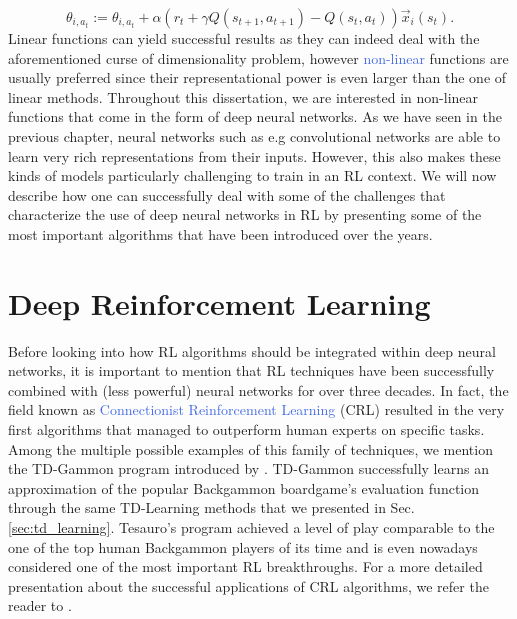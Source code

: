 \begin{equation}
	\theta_{i,a_t} := \theta_{i,a_t} + \alpha(r_t +\gamma Q(s_{t+1},a_{t+1}) - Q(s_t, a_t))\vec{x}_i(s_t).
\end{equation}
Linear functions can yield successful results \cite{lane1992theory, park1993approximation, mcculloch1943logical} as they can indeed deal with the aforementioned curse of dimensionality problem, however \textcolor{RoyalBlue}{non-linear} functions are usually preferred since their representational power is even larger than the one of linear methods. Throughout this dissertation, we are interested in non-linear functions that come in the form of deep neural networks. As we have seen in the previous chapter, neural networks such as e.g convolutional networks are able to learn very rich representations from their inputs. However, this also makes these kinds of models particularly challenging to train in an RL context. We will now describe how one can successfully deal with some of the challenges that characterize the use of deep neural networks in RL by presenting some of the most important algorithms that have been introduced over the years.    

\section{Deep Reinforcement Learning}
\label{sec:deep_reinforcement_learning}
Before looking into how RL algorithms should be integrated within deep neural networks, it is important to mention that RL techniques have been successfully combined with (less powerful) neural networks for over three decades. In fact, the field known as \textcolor{RoyalBlue}{Connectionist Reinforcement Learning} (CRL) resulted in the very first algorithms that managed to outperform human experts on specific tasks. Among the multiple possible examples of this family of techniques, we mention the TD-Gammon program introduced by \citet{tesauro1994td}. TD-Gammon successfully learns an approximation of the popular Backgammon boardgame's evaluation function through the same TD-Learning methods that we presented in Sec. \ref{sec:td_learning}. Tesauro's program achieved a level of play comparable to the one of the top human Backgammon players of its time and is even nowadays considered one of the most important RL breakthroughs. For a more detailed presentation about the successful applications of CRL algorithms, we refer the reader to \cite{bucsoniu2011approximate}.  

